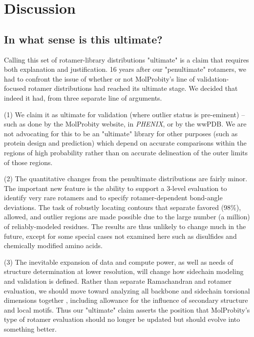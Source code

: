 \section{Discussion}

\subsection{In what sense is this ultimate?}
Calling this set of rotamer-library distributions "ultimate" is a claim that requires both explanation and justification. 16 years after our "penultimate" rotamers, we had to confront the issue of whether or not MolProbity's line of validation-focused rotamer distributions had reached its ultimate stage. We decided that indeed it had, from three separate line of arguments.

(1) We claim it as ultimate for validation (where outlier status is pre-eminent)  -- such as done by the MolProbity website, in \textit{PHENIX}, or by the wwPDB. We are not advocating for this to be an "ultimate" library for other purposes (such as protein design and prediction) which depend on accurate comparisons within the regions of high probability rather than on accurate delineation of the outer limits of those regions.

(2) The quantitative changes from the penultimate distributions are fairly minor. The important new feature is the ability to support a 3-level evaluation to identify very rare rotamers and to specify rotamer-dependent bond-angle deviations. The task of robustly locating contours that separate favored (98\%), allowed, and outlier regions are made possible due to the large number (a million) of reliably-modeled residues. The results are thus unlikely to change much in the future, except for some special cases not examined here such as disulfides and chemically modified amino acids.

(3) The inevitable expansion of data and compute power, as well as needs of structure determination at lower resolution, will change how sidechain modeling and validation is defined. Rather than separate Ramachandran and rotamer evaluation, we should move toward analyzing all backbone and sidechain torsional dimensions together \cite{JSR_theplot_2013}, including allowance for the influence of secondary structure and local motifs. Thus our "ultimate" claim asserts the position that MolProbity's type of rotamer evaluation should no longer be updated but should evolve into something better.

